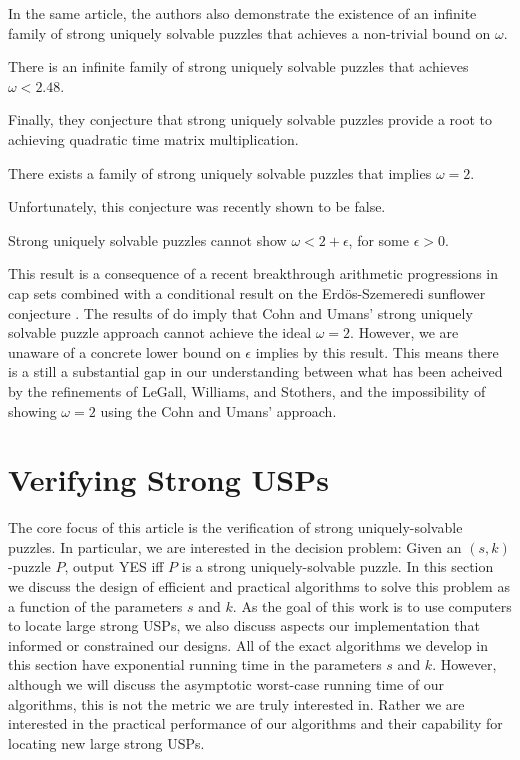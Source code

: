 \documentclass[11pt]{article}
\begin{document}
In the same article, the authors also demonstrate the existence of an
infinite family of strong uniquely solvable puzzles that achieves a
non-trivial bound on $\omega$.

\begin{lemma}
  There is an infinite family of strong uniquely solvable puzzles that
  achieves $\omega < 2.48$.
\end{lemma}

Finally, they conjecture that strong uniquely solvable puzzles provide
a root to achieving quadratic time matrix multiplication.

\begin{conjecture}
  There exists a family of strong uniquely solvable puzzles that
  implies $\omega = 2$.
\end{conjecture}

Unfortunately, this conjecture was recently shown to be false.

\begin{lemma}
  Strong uniquely solvable puzzles cannot show $\omega < 2 +
  \epsilon$, for some $\epsilon > 0$.
\end{lemma}

This result is a consequence of a recent breakthrough arithmetic
progressions in cap sets \cite{e16,clp16} combined with a conditional
result on the Erd\"{o}s-Szemeredi sunflower conjecture \cite{asu13}.
The results of \cite{bccgu16} do imply that Cohn and Umans' strong
uniquely solvable puzzle approach cannot achieve the ideal $\omega =
2$.  However, we are unaware of a concrete lower bound on $\epsilon$
implies by this result.  This means there is a still a substantial gap
in our understanding between what has been acheived by the refinements
of LeGall, Williams, and Stothers, and the impossibility of showing
$\omega = 2$ using the Cohn and Umans' approach.



\section{Verifying Strong USPs}
\label{sec:verify}

The core focus of this article is the verification of strong
uniquely-solvable puzzles.  In particular, we are interested in the
decision problem: Given an $(s,k)$-puzzle $P$, output YES iff $P$ is a
strong uniquely-solvable puzzle.  In this section we discuss the
design of efficient and practical algorithms to solve this problem as
a function of the parameters $s$ and $k$.  As the goal of this work is
to use computers to locate large strong USPs, we also discuss aspects
our implementation that informed or constrained our designs.  All of
the exact algorithms we develop in this section have exponential
running time in the parameters $s$ and $k$.  However, although we will
discuss the asymptotic worst-case running time of our algorithms, this
is not the metric we are truly interested in.  Rather we are
interested in the practical performance of our algorithms and their
capability for locating new large strong USPs.
\end{document}
